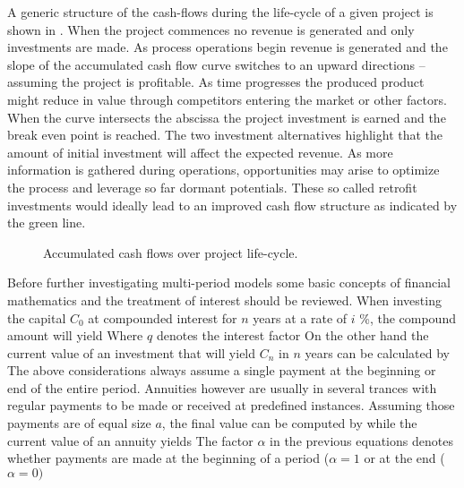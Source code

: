         A generic structure of the
        cash-flows during the life-cycle of a given project is shown in . When the project
        commences no revenue is generated and only investments are made. As process operations begin revenue
        is generated and  the slope of the accumulated cash flow curve switches to an upward directions
        -- assuming the project is profitable. As time progresses the produced product might reduce in value
        through competitors entering the market or other factors. When the curve intersects the abscissa the
        project investment is earned and the break even point is reached. The two investment alternatives highlight
        that the amount of initial investment will affect the expected revenue. As more information is gathered
        during operations, opportunities may arise to optimize the process and leverage so far dormant potentials.
        These so called retrofit investments would ideally lead to an improved cash flow structure as indicated
        by the green line.

        \begin{figure}
            \center
            
            \caption{Accumulated cash flows over project life-cycle.\cite{Marquardt.2008}}
            \label{fig:CashFlow}
        \end{figure}

        Before further investigating multi-period models some basic concepts of financial mathematics
        and the treatment of interest should be reviewed. When investing the capital $C_0$ at compounded
        interest for $n$ years at a rate of $i$ \%, the compound amount will yield
        Where $q$ denotes the interest factor
        On the other hand the current value of an investment that will yield $C_n$ in $n$ years can be calculated
        by
        The above considerations always assume a single payment at the beginning or end of the entire period.
        Annuities however are usually in several trances with regular payments to be made or received at
        predefined instances. Assuming those payments are of equal size $a$, the final value can be computed by
        while the current value of an annuity yields
        The factor $\alpha$ in the previous equations denotes whether payments are made at the beginning
        of a period ($\alpha = 1$ or at the end ($\alpha = 0)$

